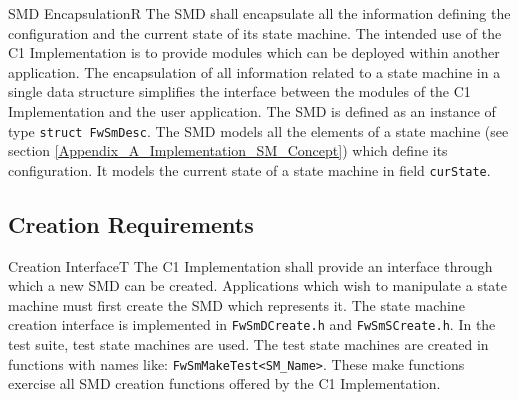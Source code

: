 \documentclass[a4paper,10pt]{article}
\newenvironment{fw_req}[6]
{\addtocounter{subsubsection}{1}
	\hspace{0.2cm}\textbf{FW-\arabic{section}.\arabic{subsection}.\arabic{subsubsection}/#2
	\hspace{0.8cm} #1}
	\vspace{-10pt}
\begin{longtable}{p{2.7cm}P{8.5cm}}
\hline
\textsc{Requirement} & #3 \\
\textsc{Justification} & #4 \\
\textsc{Implementation} & #5  \\ 
\textsc{Verification} & #6  \\
\hline
}
{\end{longtable}}
\begin{document}
\begin{fw_req}{SMD Encapsulation}{R}
{The SMD shall encapsulate all the information defining the configuration and the current state of its state machine.}
{The intended use of the C1 Implementation is to provide modules which can be deployed within another application. 
The encapsulation of all information related to a state machine in a single data structure simplifies the interface between the modules of the 
C1 Implementation and the user application.}
{The SMD is defined as an instance of type \texttt{struct FwSmDesc}.} 
{The SMD models all the elements of a state machine (see 
section \ref{Appendix_A_Implementation_SM_Concept}) which define its configuration.
It models the current state of a state machine in field \texttt{curState}.}
\end{fw_req}

\subsection{Creation Requirements}\label{req:creationInterface}

\begin{fw_req}{Creation Interface}{T}
{ The C1 Implementation shall provide an interface through which a new SMD can be created.}
{Applications which wish to manipulate a state machine must first create the SMD which represents it.}
{The state machine creation interface is implemented in \texttt{FwSmDCreate.h} and \texttt{FwSmSCreate.h}.} 
{In the test suite, test state machines are used. The test state machines are created in functions with names like: \texttt{FwSmMakeTest<SM\_Name>}. 
These make functions exercise all SMD creation functions offered by the C1 Implementation.}
\end{fw_req}
\end{document}
